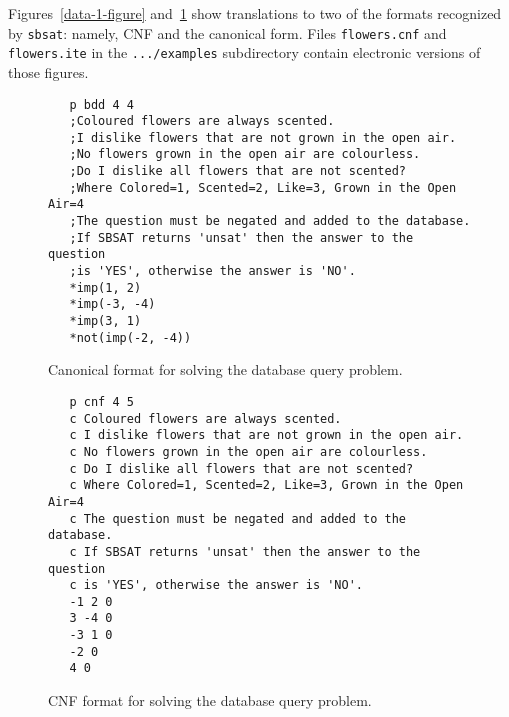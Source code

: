 Figures~\ref{data-1-figure} and~\ref{data-2-figure} show translations
to two of the formats recognized by {\tt sbsat}: namely, CNF and the
canonical form.  Files {\tt flowers.cnf} and {\tt flowers.ite} in the
{\tt .../examples} subdirectory contain electronic versions of those
figures.

\begin{figure}
\begin{verbatim}
   p bdd 4 4
   ;Coloured flowers are always scented.
   ;I dislike flowers that are not grown in the open air.
   ;No flowers grown in the open air are colourless.
   ;Do I dislike all flowers that are not scented?
   ;Where Colored=1, Scented=2, Like=3, Grown in the Open Air=4
   ;The question must be negated and added to the database.
   ;If SBSAT returns 'unsat' then the answer to the question
   ;is 'YES', otherwise the answer is 'NO'.
   *imp(1, 2)
   *imp(-3, -4)
   *imp(3, 1)
   *not(imp(-2, -4))
\end{verbatim}
\caption{Canonical format for solving the database query problem.}\label{data-1-figure}
\vspace*{6mm}
\begin{verbatim}
   p cnf 4 5
   c Coloured flowers are always scented.
   c I dislike flowers that are not grown in the open air.
   c No flowers grown in the open air are colourless.
   c Do I dislike all flowers that are not scented?
   c Where Colored=1, Scented=2, Like=3, Grown in the Open Air=4
   c The question must be negated and added to the database.
   c If SBSAT returns 'unsat' then the answer to the question
   c is 'YES', otherwise the answer is 'NO'.
   -1 2 0
   3 -4 0
   -3 1 0
   -2 0
   4 0
\end{verbatim}
\caption{CNF format for solving the database query problem.}\label{data-2-figure}
\end{figure}

